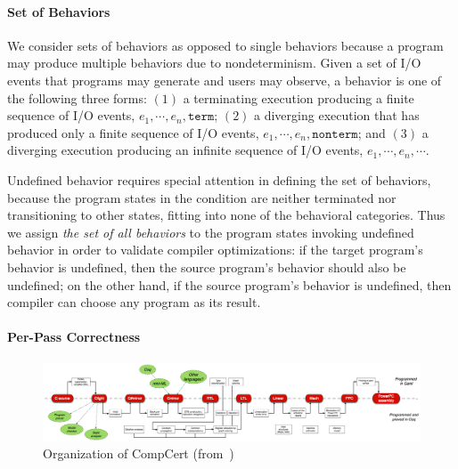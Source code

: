 \paragraph{Set of Behaviors}

We consider sets of behaviors as opposed to single behaviors because a program may produce multiple
behaviors due to nondeterminism.  Given a set of I/O events that programs may generate and users may
observe, a behavior is one of the following three forms: $(1)$ a terminating execution producing a
finite sequence of I/O events, $e_1, \cdots, e_n, \mathtt{term}$; $(2)$ a diverging execution that
has produced only a finite sequence of I/O events, $e_1, \cdots, e_n, \mathtt{nonterm}$; and $(3)$ a
diverging execution producing an infinite sequence of I/O events, $e_1, \cdots, e_n, \cdots$.

Undefined behavior requires special attention in defining the set of behaviors, because the program
states in the condition are neither terminated nor transitioning to other states, fitting into none
of the behavioral categories.  Thus we assign \emph{the set of all behaviors} to the program states
invoking undefined behavior in order to validate compiler optimizations: if the target program's
behavior is undefined, then the source program's behavior should also be undefined; on the other
hand, if the source program's behavior is undefined, then compiler can choose any program as its
result.


\paragraph{Per-Pass Correctness}

\begin{figure}[!t]
\begin{center}
\includegraphics[width=\textwidth]{compcert-diagram.png}
\end{center}
\caption{Organization of CompCert (from~\cite{compcert-web})  }
\label{fig:compcert-organization}
\end{figure}

